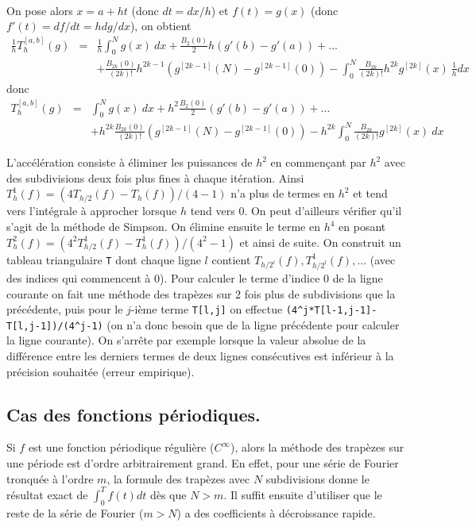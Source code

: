 \documentclass[a4paper,11pt]{article}
\begin{document}
\begin{giacjshere}
\begin{eqnarray*}
\end{eqnarray*}
On pose alors $x=a+ht$ (donc $dt=dx/h$) et $f(t)=g(x)$
(donc $f'(t)=df/dt=h dg/dx$), on obtient 
\begin{eqnarray*}
 \frac1h T_h^{[a,b]}(g)&=& \frac1h \int_0^N g(x) \ dx 
+ \frac{B_2(0)}{2} h(g'(b)-g'(a)) 
+ ... \\
& &+ \frac{B_{2k}(0)}{(2k)!} h^{2k-1} (g^{[2k-1]}(N)-g^{[2k-1]}(0)) 
- \int_0^N \frac{B_{2k}}{(2k)!} h^{2k} g^{[2k]}(x) \ \frac1h dx 
\end{eqnarray*}
donc
\begin{eqnarray*}
 T_h^{[a,b]}(g) &=&  \int_0^N g(x) \ dx 
+ h^2 \frac{B_2(0)}{2} (g'(b)-g'(a)) 
+ ... \\
& & + h^{2k} \frac{B_{2k}(0)}{(2k)!}  (g^{[2k-1]}(N)-g^{[2k-1]}(0)) 
- h^{2k} \int_0^N \frac{B_{2k}}{(2k)!}  g^{[2k]}(x) \  dx 
\end{eqnarray*}

L'accélération consiste à éliminer les puissances de $h^2$ en
commençant par $h^2$ avec des subdivisions deux fois plus fines
à chaque itération.
Ainsi $T_h^1(f) = (4T_{h/2}(f)-T_h(f))/(4-1)$ n'a plus de termes en $h^2$
et tend vers l'intégrale à approcher lorsque $h$ tend vers 0. 
On peut d'ailleurs vérifier qu'il s'agit de la méthode de Simpson.
On élimine ensuite le terme en $h^4$ en posant
$T_h^2(f)=(4^2 T_{h/2}^1(f)-T_h^1(f))/(4^2-1)$ et ainsi
de suite. On construit un tableau triangulaire \verb|T|
dont chaque
ligne $l$ contient $T_{h/2^l}(f), T_{h/2^l}^1(f), ...$ 
(avec des indices qui commencent à 0). Pour
calculer le terme d'indice 0 de la ligne courante
on fait une méthode des trapèzes sur 2 fois plus
de subdivisions que la précédente, puis pour le $j$-ième terme
\verb|T[l,j]|
on effectue \verb|(4^j*T[l-1,j-1]-T[l,j-1])/(4^j-1)|
(on n'a donc besoin que de la ligne précédente pour calculer
la ligne courante).
On s'arrête par exemple lorsque la valeur absolue de la différence
entre les derniers termes de deux lignes consécutives est inférieur
à la précision souhaitée (erreur empirique).


\subsection{Cas des fonctions p\'eriodiques.}
Si $f$ est une fonction p\'eriodique r\'eguli\`ere ($C^\infty$),
alors la m\'ethode des trap\`ezes sur une p\'eriode est d'ordre 
arbitrairement grand. En effet, pour une s\'erie de Fourier tronqu\'ee
\`a l'ordre $m$, la formule des trap\`ezes avec $N$ subdivisions donne
le r\'esultat exact de $\int_0^T f(t) dt$ d\`es que $N>m$. Il suffit
ensuite d'utiliser que le reste de
la s\'erie de Fourier ($m>N$) 
a des coefficients \`a d\'ecroissance rapide.


\end{giacjshere}
\end{document}
